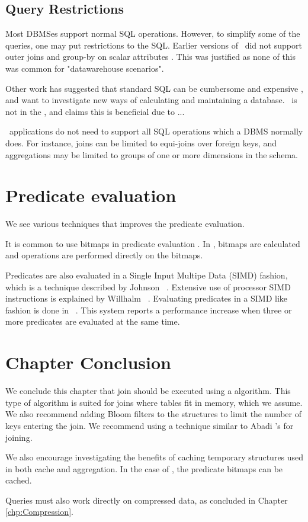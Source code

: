 \subsection{Query Restrictions}
\label{sub:Query Restrictions}
Most DBMSes support normal SQL operations. However, to simplify some of the queries, one may put restrictions to the SQL. Earlier versions of \mssql~did not support outer joins and group-by on scalar attributes \cite{Larson2013-mc}. This was justified as none of this was common for "datawarehouse scenarios".

Other work has suggested that standard SQL can be cumbersome and expensive \cite{Plattner2014-fr}, and want to investigate new ways of calculating and maintaining a database. \qlikview~is not in the , and claims this is beneficial due to ... 

\bd~applications do not need to support all SQL operations which a DBMS normally does. For instance, joins can be limited to equi-joins over foreign keys, and aggregations may be limited to groups of one or more dimensions in the schema.

\section{Predicate evaluation}
\label{sec:Predicate evaluation}
We see various techniques that improves the predicate evaluation.

It is common to use bitmaps in predicate evaluation \cite{Raman2008-gi, Raman2013-em}. In \blink, bitmaps are calculated and operations are performed directly on the bitmaps.

Predicates are also evaluated in a Single Input Multipe Data (SIMD) fashion, which is a technique described by Johnson \ea~\cite{Johnson2008-cp}. Extensive use of processor SIMD instructions is explained by Willhalm \ea~\cite{Willhalm2009-hu, Willhalm2013-ri}. Evaluating predicates in a SIMD like fashion is done in \blink~\cite{Raman2008-gi}.  This system reports a performance increase when three or more predicates are evaluated at the same time.

\section{Chapter Conclusion}
\label{sec:Chapter Conclusion}
We conclude this chapter that join should be executed using a  algorithm. This type of algorithm is suited for joins where tables fit in memory, which we assume. We also recommend adding Bloom filters to the structures to limit the number of keys entering the join. We recommend using a technique similar to Abadi \ea's  for joining.

We also encourage investigating the benefits of caching temporary structures used in both cache and aggregation. In the case of , the predicate bitmaps can be cached.

Queries must also work directly on compressed data, as concluded in Chapter \ref{chp:Compression}.
